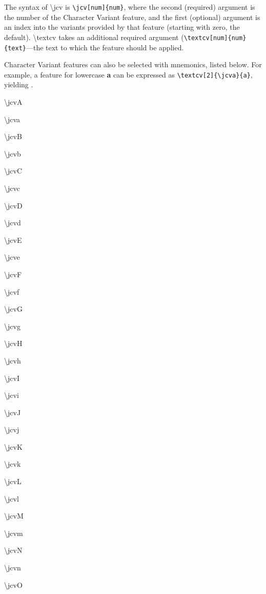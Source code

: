 \documentclass[12pt]{article}
\begin{document}
\noindent The syntax of \textbackslash jcv
is {\color{BrickRed}\verb|\jcv[num]{num}|}, where the second (required) argument is the number of the Character Variant feature,
and the first (optional) argument is an index into the variants provided by that feature (starting with zero, the default).
\textbackslash textcv takes an additional required argument ({\color{BrickRed}\verb|\textcv[num]{num}{text}|}—the text to which the
feature should be applied.

Character Variant features can also be selected with mnemonics, listed below. For example, a feature for
lowercase \textbf{a} can be expressed as {\color{BrickRed}\verb|\textcv[2]{\jcva}{a}|}, yielding \textbf{}.

\begin{multicols}{3}
\small\jCond\textbackslash jcvA

\textbackslash jcva

\textbackslash jcvB

\textbackslash jcvb

\textbackslash jcvC

\textbackslash jcvc

\textbackslash jcvD

\textbackslash jcvd

\textbackslash jcvE

\textbackslash jcve

\textbackslash jcvF

\textbackslash jcvf

\textbackslash jcvG

\textbackslash jcvg

\textbackslash jcvH

\textbackslash jcvh

\textbackslash jcvI

\textbackslash jcvi

\textbackslash jcvJ

\textbackslash jcvj

\textbackslash jcvK

\textbackslash jcvk

\textbackslash jcvL

\textbackslash jcvl

\textbackslash jcvM

\textbackslash jcvm

\textbackslash jcvN

\textbackslash jcvn

\textbackslash jcvO


\end{multicols}
\end{document}
